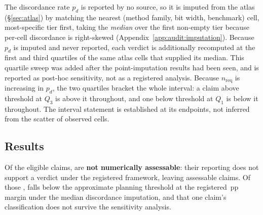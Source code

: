 The discordance rate $p_d$ is reported by no source, so it is imputed from the
atlas (\S\ref{sec:atlas}) by matching the nearest (method family, bit width,
benchmark) cell, most-specific tier first, taking the \emph{median} over the
first non-empty tier because per-cell discordance is right-skewed
(Appendix~\ref{app:audit:imputation}). Because $p_d$ is imputed and never
reported, each verdict is additionally recomputed at the first and third
quartiles of the same atlas cells that supplied its median.
This quartile sweep was added after the point-imputation results had been seen,
and is reported as post-hoc sensitivity, not as a registered analysis.
Because $n_{\mathrm{req}}$ is increasing in $p_d$, the two quartiles bracket the
whole interval: a claim above threshold at $Q_3$ is above it throughout, and one
below threshold at $Q_1$ is below it throughout. The interval statement is
established at its endpoints, not inferred from the scatter of observed cells.

\subsection{Results}
\label{sec:audit:results}

Of the \AuditEligible{} eligible claims, \AuditNotAssessable{} are \textbf{not
numerically assessable}: their reporting does not support a verdict under the
registered framework, leaving \AuditAssessable{} assessable claims. Of those
\AuditAssessable{}, \AuditBelowThresholdAtMedian{} falls below the
approximate planning threshold at the registered \AuditMarginPP{}\,pp margin
under the median discordance imputation, and that one claim's classification
does not survive the sensitivity analysis.

